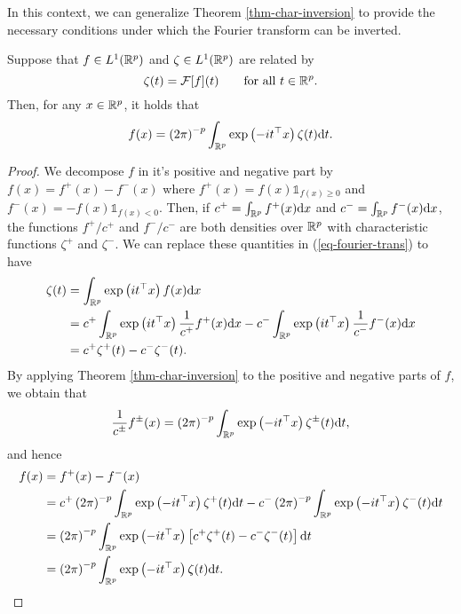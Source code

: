 In this context, we can generalize Theorem \ref{thm-char-inversion} to provide the necessary conditions under which the Fourier transform can be inverted.

\begin{corollary} \label{corr-fourier-inv}
    Suppose that $f \in L^1({\mathbb{R}^p})$ and $\zeta \in L^1({\mathbb{R}^p})$ are related by
    \begin{equation}\label{eq-fourier-trans}
        \zeta(t) = \mathcal{F}[f](t) \ \ \ \ \ \ {\textrm{for all }} t \in {\mathbb{R}^p}.
    \end{equation}
    Then, for any $x \in {\mathbb{R}^p}$, it holds that
    \begin{equation} \label{eq-fourier-inv}
        f(x) = \left(2\pi\right)^{-p}\int_{\mathbb{R}^p} \exp\left(-i t^\top x\right) \zeta(t) \text{d} t.
    \end{equation}
\end{corollary}

\begin{proof}
    We decompose $f$ in it's positive and negative part by $f(x) = f^+(x) - f^-(x)$ where $f^+(x) = f(x) \mathbb{1}_{f(x) \geq 0}$ and $f^-(x) = -f(x) \mathbb{1}_{f(x) < 0}$. Then, if $c^+ = \int_{\mathbb{R}^p} f^+(x) \text{d} x$ and $c^- = \int_{\mathbb{R}^p} f^-(x) \text{d} x$, the functions $f^+ / c^+$ and $f^- / c^-$ are both densities over ${\mathbb{R}^p}$ with characteristic functions $\zeta^+$ and $\zeta^-$. We can replace these quantities in (\ref{eq-fourier-trans}) to have
    \begin{align*}
        \zeta(t) 
        &= \int_{\mathbb{R}^p} \exp\left(it^\top x\right)f(x)\text{d} x \\
        &= c^+ \int_{\mathbb{R}^p} \exp\left(it^\top x\right) \frac{1}{c^+}f^+(x)\text{d} x - c^- \int_{\mathbb{R}^p} \exp\left(it^\top x\right) \frac{1}{c^-}f^-(x)\text{d} x\\
        &= c^+ \zeta^+(t) - c^-\zeta^-(t).
    \end{align*}
    By applying Theorem \ref{thm-char-inversion} to the positive and negative parts of $f$, we obtain that
    \begin{equation*}
        \frac{1}{c^\pm} f^\pm(x) = \left(2\pi\right)^{-p}\int_{\mathbb{R}^p} \exp\left(-i t^\top x\right) \zeta^\pm(t) \text{d} t,
    \end{equation*}
    and hence
    \begin{align*}
        f(x) 
        &= f^+(x) - f^-(x) \\
        &= c^+ \left(2\pi\right)^{-p}\int_{\mathbb{R}^p} \exp\left(-i t^\top x\right) \zeta^+(t) \text{d} t
         - c^- \left(2\pi\right)^{-p}\int_{\mathbb{R}^p} \exp\left(-i t^\top x\right) \zeta^-(t) \text{d} t \\
        &= \left(2\pi\right)^{-p}\int_{\mathbb{R}^p} \exp\left(-i t^\top x\right) \left[ c^+\zeta^+(t) - c^-\zeta^-(t)\right] \text{d} t\\
        &= \left(2\pi\right)^{-p}\int_{\mathbb{R}^p} \exp\left(-i t^\top x\right) \zeta(t) \text{d} t.
    \end{align*}
\end{proof}

